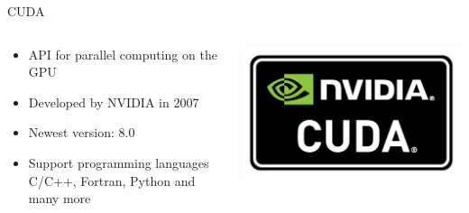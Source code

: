 \documentclass{beamer}
\begin{document}
\begin{frame}{CUDA}
	\begin{columns}[T]
		\begin{column}{0.75\textwidth}
			\begin{itemize}
				\item API for parallel computing on the GPU
				\item Developed by NVIDIA in 2007 
				\item Newest version: 8.0
				\item Support programming languages C/C++, Fortran, Python and many more
			\end{itemize}
		\end{column}
		\begin{column}{0.25\textwidth}
			\includegraphics[width=1.0\textwidth]{cuda_logo.jpg}
		\end{column}
	\end{columns}
\end{frame}
\end{document}

